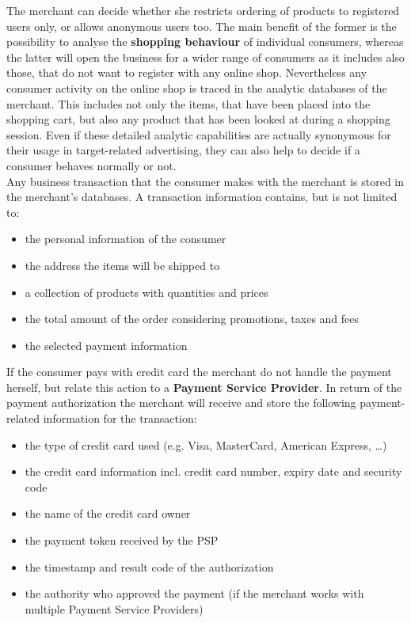 The merchant can decide whether she restricts ordering of products to registered users only, or allows anonymous users too. The main benefit of the former is the possibility to analyse the \textbf{shopping behaviour} of individual consumers, whereas the latter will open the business for a wider range of consumers as it includes also those, that do not want to register with any online shop. Nevertheless any consumer activity on the online shop is traced in the analytic databases of the merchant. This includes not only the items, that have been placed into the shopping cart, but also any product that has been looked at during a shopping session. Even if these detailed analytic capabilities are actually synonymous for their usage in target-related advertising, they can also help to decide if a consumer behaves normally or not. \\

Any business transaction that the consumer makes with the merchant is stored in the merchant's databases. A transaction information contains, but is not limited to:\@

\begin{itemize}
		\item the personal information of the consumer
		\item the address the items will be shipped to
		\item a collection of products with quantities and prices
		\item the total amount of the order considering promotions, taxes and fees
		\item the selected payment information
\end{itemize}

If the consumer pays with credit card the merchant do not handle the payment herself, but relate this action to a \textbf{Payment Service Provider}. In return of the payment authorization the merchant will receive and store the following payment-related information for the transaction:\@

\begin{itemize}
		\item the type of credit card used (e.g. Visa, MasterCard, American Express, \ldots)
		\item the credit card information incl. credit card number, expiry date and security code
		\item the name of the credit card owner
		\item the payment token received by the \gls{PSP}
		\item the timestamp and result code of the authorization
		\item the authority who approved the payment (if the merchant works with multiple Payment Service Providers)
\end{itemize}

